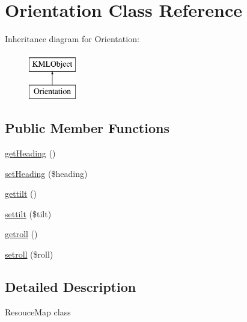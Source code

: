 \hypertarget{classOrientation}{
\section{Orientation Class Reference}
\label{d3/d38/classOrientation}
}
Inheritance diagram for Orientation:\begin{figure}[H]
\begin{center}
\leavevmode
\includegraphics[height=2.000000cm]{d3/d38/classOrientation}
\end{center}
\end{figure}
\subsection*{Public Member Functions}
\begin{DoxyCompactItemize}
\item 
\hyperlink{classOrientation_aed957bd35bd0380a58d54cbaa0fd51cd}{getHeading} ()
\item 
\hyperlink{classOrientation_a5f56197d205655a4d919406c2e3fee8e}{setHeading} (\$heading)
\item 
\hyperlink{classOrientation_a1552d0fa3855d61243758a80e3fa2a10}{gettilt} ()
\item 
\hyperlink{classOrientation_ad44b5a0d3456959eeaaef79ac317440a}{settilt} (\$tilt)
\item 
\hyperlink{classOrientation_a88299cbf84282d78a4abce6152246a0e}{getroll} ()
\item 
\hyperlink{classOrientation_a231ec26615cf770791ffc4033000e813}{setroll} (\$roll)
\end{DoxyCompactItemize}


\subsection{Detailed Description}
ResouceMap class 

